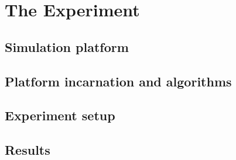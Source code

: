 \section{The Experiment}
\label{experiment}


\subsection{Simulation platform}
\label{exp_platform}


\subsection{Platform incarnation and algorithms}
\label{exp_incarnation}


\subsection{Experiment setup}
\label{exp_setup}



\subsection{Results}
\label{exp_results}


